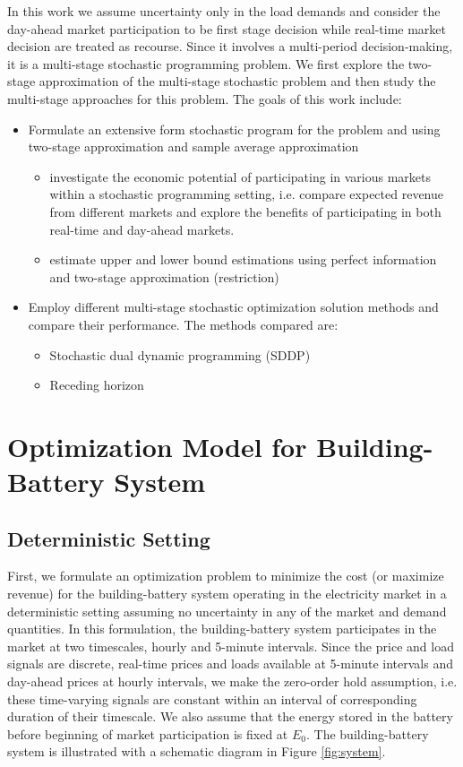 \documentclass[11pt,twoside]{article}
\begin{document}
In this work we assume uncertainty only in the load demands and consider the day-ahead market participation to be first stage decision while real-time market decision are treated as recourse. Since it involves a multi-period decision-making, it is a multi-stage stochastic programming problem. We first explore the two-stage approximation of the multi-stage stochastic problem and then study the multi-stage approaches for this problem. The goals of this work include:
\begin{itemize}
\item Formulate an extensive form stochastic program for the problem and using two-stage approximation and sample average approximation
\begin{itemize}
\item investigate the economic potential of participating in various markets within a stochastic programming setting, i.e. compare expected revenue from different markets and explore the benefits of participating in both real-time and day-ahead markets.
\item estimate upper and lower bound estimations using perfect information and two-stage approximation (restriction)
\end{itemize}
\item Employ different multi-stage stochastic optimization solution methods and compare their performance. The methods compared are:
\begin{itemize}
\item Stochastic dual dynamic programming (SDDP)
\item Receding horizon 
\end{itemize}
\end{itemize}

\section{Optimization Model for Building-Battery System}\label{sec:model}
\subsection{Deterministic Setting}\label{subsec:deterministic}
First, we formulate an optimization problem to minimize the cost (or maximize revenue) for the building-battery system operating in the electricity market in a deterministic setting assuming no uncertainty in any of the market and demand quantities. In this formulation, the building-battery system participates in the market at two timescales, hourly and 5-minute intervals. Since the price and load signals are discrete, real-time prices and loads available at 5-minute intervals and day-ahead prices at hourly intervals, we make the zero-order hold assumption, i.e. these time-varying signals are constant within an interval of corresponding duration of their timescale. We also assume that the energy stored in the battery before beginning of market participation is fixed at $E_{0}$. The building-battery system is illustrated with a schematic diagram in Figure \ref{fig:system}.
\end{document}
